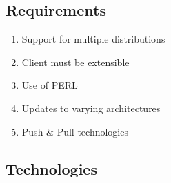 	\vspace{3mm}

	\subsection{Requirements}
	
		\begin{enumerate}[itemsep=1pt,parsep=1pt]
		
			\item 	Support for multiple distributions
			\item 	Client must be extensible
			\item 	Use of PERL 
			\item 	Updates to varying architectures
			\item   Push \& Pull technologies
			
		\end{enumerate}
		
	\subsection{Technologies}
	
